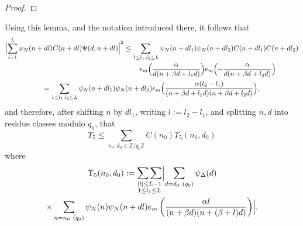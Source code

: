 \documentclass[12pt,a4paper,reqno]{amsart}
\numberwithin{equation}{section}
\theoremstyle{plain}
\theoremstyle{definition}
\newcommand\Z{\mathbb{Z}}
\newcommand\sumsum{\mathop{\sum\sum}\limits}
\begin{document}
\begin{proof}
\end{proof}

Using this lemma, and the notation introduced there, it follows that
\begin{multline*}
  \Bigl|\sum_{l=1}^L \psi_N(n+dl) C(n+dl) \Psi(d,n+dl)\Bigr|^2 \leq \sum_{1
    \leq l_1,l_2 \leq L} \psi_N(n+dl_1) \psi_N(n+dl_2) C(n+dl_1) C(n+dl_2)\\
\quad\quad\quad\quad\quad\quad\quad\quad\quad\quad\quad\quad
\quad\quad\quad\quad
  e_m\Bigl(\frac{\alpha}{d(n+\beta d+l_1d)}\Bigr)
  e_m\Bigl(-\frac{\alpha}{d(n+\beta d+l_2d)}\Bigr)
  \\
  =\sum_{1 \leq l_1,l_2 \leq L} \psi_N(n+dl_1) \psi_N(n+dl_2)
  e_m\Bigl(\frac{\alpha (l_2-l_1)}{(n+\beta d+l_1d)(n+\beta d+l_2d)}
  \Bigr),
\end{multline*}
and therefore, after shifting $n$ by $dl_1$, writing $l := l_2-l_1$, and splitting $n,d$ into residue classes modulo $q_0$, that
$$ \Upsilon_5 \leq \sum_{n_0, d_0 \in \Z/q_0\Z} C(n_0) \Upsilon_5(n_0,d_0) $$
where
\begin{multline}\label{eq-bound-up5}
  \Upsilon_5(n_0,d_0) := \sumsum_{\substack{|l|\leq L-1\\1\leq l_1
      \leq L}}  \Bigl|\sum_{d=d_0\ (q_0)} \psi_{\Delta}(d)\\
  \times \sum_{n=n_0\ (q_0)} \psi_N(n)
  \psi_N(n+dl)e_m\left(\frac{\alpha l}{(n+\beta d)(n+(\beta+l)d)}
  \right)\Bigr|.
\end{multline}
\end{document}
